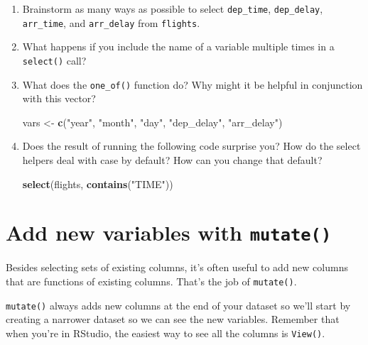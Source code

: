 \documentclass[]{book}
\newenvironment{Shaded}{\begin{snugshade}}{\end{snugshade}}
\newcommand{\KeywordTok}[1]{\textcolor[rgb]{0.13,0.29,0.53}{\textbf{{#1}}}}
\newcommand{\StringTok}[1]{\textcolor[rgb]{0.31,0.60,0.02}{{#1}}}
\newcommand{\NormalTok}[1]{{#1}}
\begin{document}
\begin{enumerate}
\def\labelenumi{\arabic{enumi}.}
\item
  Brainstorm as many ways as possible to select \texttt{dep\_time},
  \texttt{dep\_delay}, \texttt{arr\_time}, and \texttt{arr\_delay} from
  \texttt{flights}.
\item
  What happens if you include the name of a variable multiple times in a
  \texttt{select()} call?
\item
  What does the \texttt{one\_of()} function do? Why might it be helpful
  in conjunction with this vector?

\begin{Shaded}
\begin{Highlighting}[]
\NormalTok{vars <-}\StringTok{ }\KeywordTok{c}\NormalTok{(}\StringTok{"year"}\NormalTok{, }\StringTok{"month"}\NormalTok{, }\StringTok{"day"}\NormalTok{, }\StringTok{"dep_delay"}\NormalTok{, }\StringTok{"arr_delay"}\NormalTok{)}
\end{Highlighting}
\end{Shaded}
\item
  Does the result of running the following code surprise you? How do the
  select helpers deal with case by default? How can you change that
  default?

\begin{Shaded}
\begin{Highlighting}[]
\KeywordTok{select}\NormalTok{(flights, }\KeywordTok{contains}\NormalTok{(}\StringTok{"TIME"}\NormalTok{))}
\end{Highlighting}
\end{Shaded}
\end{enumerate}

\section{\texorpdfstring{Add new variables with
\texttt{mutate()}}{Add new variables with mutate()}}\label{add-new-variables-with-mutate}

Besides selecting sets of existing columns, it's often useful to add new
columns that are functions of existing columns. That's the job of
\texttt{mutate()}.

\texttt{mutate()} always adds new columns at the end of your dataset so
we'll start by creating a narrower dataset so we can see the new
variables. Remember that when you're in RStudio, the easiest way to see
all the columns is \texttt{View()}.
\end{document}
